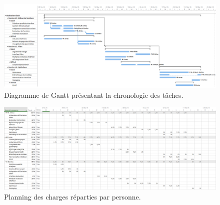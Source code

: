         \begin{landscape}
            \begin{figure}
                \centering
                \includegraphics[height=0.66\textwidth]{figure/DiagGantt.png}
                \caption{Diagramme de Gantt présentant la chronologie des tâches.}
                \label{fig:gantt}
            \end{figure}
        \end{landscape}

        \begin{landscape}
            \begin{figure}
                \centering
                \includegraphics[height=0.66\textwidth]{figure/RepartitionTaches2.png}
                \caption{Planning des charges réparties par personne.}
                \label{fig:planning_charge}
            \end{figure}
        \end{landscape}

